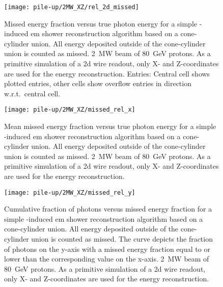 \begin{figure}[tbp]
	\centering
	\texttt{[image: pile-up/2MW\_XZ/rel\_2d\_missed]}
	\caption[Pile-up study missed fractional vs.\ true photon energy, \SI{2}{\mega\watt} beam, XZ projection]{%
		Missed energy fraction versus true photon energy for a simple \Pgpz-induced \acrshort{em} shower reconstruction algorithm based on a cone-cylinder union.
		All energy deposited outside of the cone-cylinder union is counted as missed.
		\SI{2}{\mega\watt} beam of \SI{80}{\giga\electronvolt} protons.
		As a primitive simulation of a \acrshort{2d} wire readout, only X- and Z-coordinates are used for the energy reconstruction.
		Entries: Central cell shows plotted entries, other cells show overflow entries in direction w.r.t.\ central cell.
	}
\end{figure}

\begin{figure}[tbp]
	\centering
	\texttt{[image: pile-up/2MW\_XZ/missed\_rel\_x]}
	\caption[Pile-up study mean missed fractional vs.\ true photon energy, \SI{2}{\mega\watt} beam, XZ projection]{%
		Mean missed energy fraction versus true photon energy for a simple \Pgpz-induced \acrshort{em} shower reconstruction algorithm based on a cone-cylinder union.
		All energy deposited outside of the cone-cylinder union is counted as missed.
		\SI{2}{\mega\watt} beam of \SI{80}{\giga\electronvolt} protons.
		As a primitive simulation of a \acrshort{2d} wire readout, only X- and Z-coordinates are used for the energy reconstruction.
	}
\end{figure}

\begin{figure}[tbp]
	\centering
	\texttt{[image: pile-up/2MW\_XZ/missed\_rel\_y]}
	\caption[Pile-up study photon vs.\ missed energy fraction, \SI{2}{\mega\watt} beam, XZ projection]{%
		Cumulative fraction of photons versus missed energy fraction for a simple \Pgpz-induced \acrshort{em} shower reconstruction algorithm based on a cone-cylinder union.
		All energy deposited outside of the cone-cylinder union is counted as missed.
		The curve depicts the fraction of photons on the y-axis with a missed energy fraction equal to or lower than the corresponding value on the x-axis.
		\SI{2}{\mega\watt} beam of \SI{80}{\giga\electronvolt} protons.
		As a primitive simulation of a \acrshort{2d} wire readout, only X- and Z-coordinates are used for the energy reconstruction.
	}
\end{figure}

